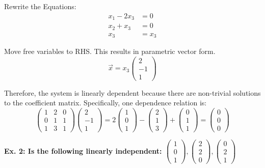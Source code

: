 \noindent
\newline
Rewrite the Equations:
\begin{align}
    x_1 - 2x_3 &= 0 \\
    x_2 + x_3 &= 0 \\
    x_3 &= x_3
\end{align}

\noindent
\newline
Move free variables to RHS. This results in parametric vector form.
\begin{equation}
    \Vec{x} = x_3 \begin{pmatrix}
        2 \\
        -1 \\
        1
    \end{pmatrix}
\end{equation}

\noindent
\newline
Therefore, the system is linearly dependent because there are non-trivial solutions to the coefficient matrix. Specifically, one dependence relation is:
\begin{equation}
    \begin{pmatrix}
        1 & 2 & 0 \\
        0 & 1 & 1 \\
        1 & 3 & 1
    \end{pmatrix} \begin{pmatrix}
        2 \\
        -1 \\
        1
    \end{pmatrix} = 2\begin{pmatrix}1 \\ 0 \\ 1\end{pmatrix} - \begin{pmatrix}2 \\ 1 \\ 3\end{pmatrix} + \begin{pmatrix}0 \\ 1 \\ 1\end{pmatrix} = \begin{pmatrix}0 \\ 0 \\ 0\end{pmatrix}
\end{equation}

\noindent
\newline
\textbf{Ex. 2: Is the following linearly independent: \(\begin{pmatrix}1 \\ 0 \\ 1\end{pmatrix}, \begin{pmatrix}2 \\ 2 \\ 0\end{pmatrix}, \begin{pmatrix}0 \\ 2 \\ 1\end{pmatrix}\)}

